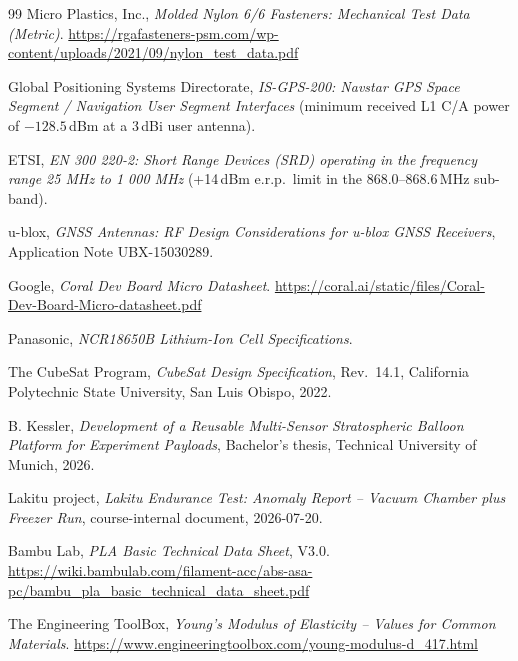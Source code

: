 \begin{thebibliography}{99}
 Micro Plastics, Inc., \emph{Molded Nylon 6/6
Fasteners: Mechanical Test Data (Metric)}.
\url{https://rgafasteners-psm.com/wp-content/uploads/2021/09/nylon_test_data.pdf}

 Global Positioning Systems Directorate, \emph{IS-GPS-200:
Navstar GPS Space Segment / Navigation User Segment Interfaces} (minimum
received L1 C/A power of $-128.5$\,dBm at a 3\,dBi user antenna).

 ETSI, \emph{EN 300 220-2: Short Range Devices (SRD) operating
in the frequency range 25 MHz to 1 000 MHz} (+14\,dBm e.r.p.\ limit in the
868.0--868.6\,MHz sub-band).

 u-blox, \emph{GNSS Antennas: RF Design Considerations for
u-blox GNSS Receivers}, Application Note UBX-15030289.

 Google, \emph{Coral Dev Board Micro Datasheet}.
\url{https://coral.ai/static/files/Coral-Dev-Board-Micro-datasheet.pdf}

 Panasonic, \emph{NCR18650B Lithium-Ion Cell Specifications}.

 The CubeSat Program, \emph{CubeSat Design Specification},
Rev.~14.1, California Polytechnic State University, San Luis Obispo, 2022.

 B. Kessler, \emph{Development of a Reusable Multi-Sensor
Stratospheric Balloon Platform for Experiment Payloads}, Bachelor's thesis,
Technical University of Munich, 2026.

 Lakitu project, \emph{Lakitu Endurance Test: Anomaly
Report -- Vacuum Chamber plus Freezer Run}, course-internal document,
2026-07-20.

 Bambu Lab, \emph{PLA Basic Technical Data Sheet}, V3.0.
\url{https://wiki.bambulab.com/filament-acc/abs-asa-pc/bambu_pla_basic_technical_data_sheet.pdf}

 The Engineering ToolBox, \emph{Young's Modulus of Elasticity
-- Values for Common Materials}.
\url{https://www.engineeringtoolbox.com/young-modulus-d_417.html}

\end{thebibliography}
